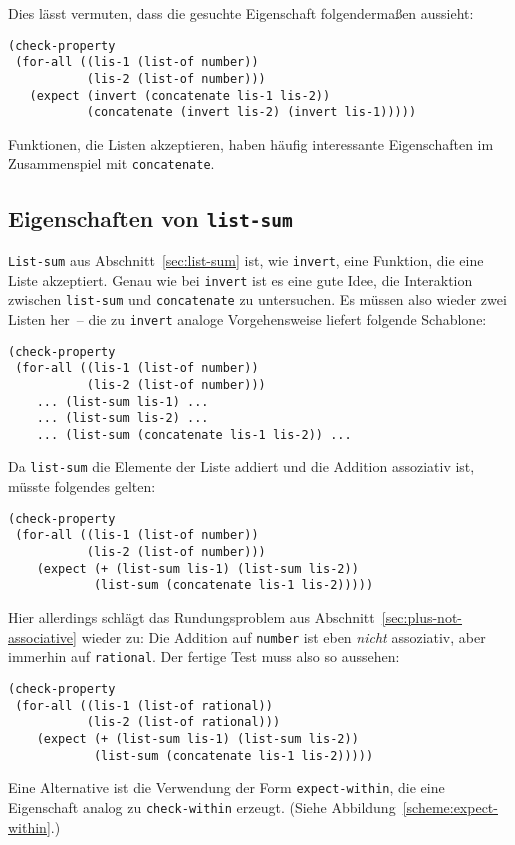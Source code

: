 %
Dies lässt vermuten, dass die gesuchte Eigenschaft folgendermaßen aussieht:
%
\begin{lstlisting}
(check-property
 (for-all ((lis-1 (list-of number))
           (lis-2 (list-of number)))
   (expect (invert (concatenate lis-1 lis-2))
           (concatenate (invert lis-2) (invert lis-1)))))
\end{lstlisting}
%
\begin{mantra}
  Funktionen, die Listen akzeptieren, haben häufig interessante
  Eigenschaften im Zusammenspiel mit \lstinline{concatenate}.
\end{mantra}

\subsection{Eigenschaften von \lstinline{list-sum}}

\lstinline{List-sum} aus
Abschnitt~\ref{sec:list-sum} ist, wie \lstinline{invert}, eine Funktion,
die eine Liste akzeptiert.  Genau wie bei \lstinline{invert} ist es eine
gute Idee, die Interaktion zwischen \lstinline{list-sum} und
\lstinline{concatenate} zu untersuchen.  Es müssen also wieder zwei
Listen her~-- die zu \lstinline{invert} analoge Vorgehensweise liefert
folgende Schablone:
%
\begin{lstlisting}
(check-property
 (for-all ((lis-1 (list-of number))
           (lis-2 (list-of number)))
    ... (list-sum lis-1) ...
    ... (list-sum lis-2) ...
    ... (list-sum (concatenate lis-1 lis-2)) ...
\end{lstlisting}
%
Da \lstinline{list-sum} die Elemente der Liste addiert und die Addition
assoziativ ist, müsste folgendes gelten:
%
\begin{lstlisting}
(check-property
 (for-all ((lis-1 (list-of number))
           (lis-2 (list-of number)))
    (expect (+ (list-sum lis-1) (list-sum lis-2))
            (list-sum (concatenate lis-1 lis-2)))))
\end{lstlisting}
%
Hier allerdings schlägt das Rundungsproblem aus
Abschnitt~\ref{sec:plus-not-associative} wieder zu: Die Addition auf
\lstinline{number} ist eben \emph{nicht} assoziativ, aber immerhin auf
\lstinline{rational}.  Der fertige Test muss also so aussehen:
%
\begin{lstlisting}
(check-property
 (for-all ((lis-1 (list-of rational))
           (lis-2 (list-of rational)))
    (expect (+ (list-sum lis-1) (list-sum lis-2))
            (list-sum (concatenate lis-1 lis-2)))))
\end{lstlisting}
%
Eine Alternative ist die Verwendung der Form
\lstinline{expect-within},
die eine Eigenschaft analog zu \lstinline{check-within} erzeugt.  (Siehe
Abbildung~\ref{scheme:expect-within}.)


